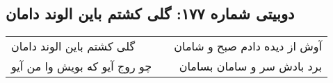 \begin{center}
\section*{دوبیتی شماره ۱۷۷: گلی کشتم باین الوند دامان}
\label{sec:177}
\begin{longtable}{l p{0.5cm} r}
گلی کشتم باین الوند دامان
&&
آوش از دیده دادم صبح و شامان
\\
چو روج آیو که بویش وا من آیو
&&
برد بادش سر و سامان بسامان
\\
\end{longtable}
\end{center}

